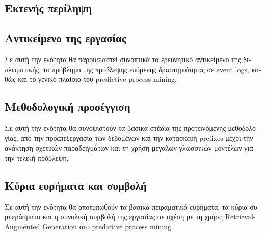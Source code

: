 \begin{otherlanguage}{greek}
\justifying
\chapter*{Εκτενής περίληψη}
\setcounter{section}{0}
\renewcommand{\thesection}{\arabic{section}}

\section{Αντικείμενο της εργασίας}
Σε αυτή την ενότητα θα παρουσιαστεί συνοπτικά το ερευνητικό αντικείμενο της διπλωματικής, το πρόβλημα της πρόβλεψης επόμενης δραστηριότητας σε event logs, καθώς και το γενικό πλαίσιο του predictive process mining.

\section{Μεθοδολογική προσέγγιση}
Σε αυτή την ενότητα θα συνοψιστούν τα βασικά στάδια της προτεινόμενης μεθοδολογίας, από την προεπεξεργασία των δεδομένων και την κατασκευή prefixes μέχρι την ανάκτηση σχετικών παραδειγμάτων και τη χρήση μεγάλων γλωσσικών μοντέλων για την τελική πρόβλεψη.

\section{Κύρια ευρήματα και συμβολή}
Σε αυτή την ενότητα θα αποτυπωθούν τα βασικά πειραματικά ευρήματα, τα κύρια συμπεράσματα και η συνολική συμβολή της εργασίας σε σχέση με τη χρήση Retrieval-Augmented Generation στο predictive process mining.

\renewcommand{\thesection}{\thechapter.\arabic{section}}
\blankpage
\end{otherlanguage}
